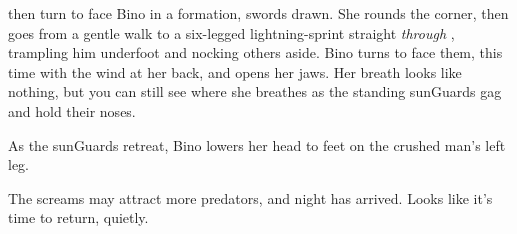 then turn to face Bino in a formation, swords drawn.
She rounds the corner, then goes from a gentle walk to a six-legged lightning-sprint straight \emph{through} , trampling him underfoot and nocking others aside.
Bino turns to face them, this time with the wind at her back, and opens her jaws.
Her breath looks like nothing, but you can still see where she breathes as the standing \glspl{sunGuard} gag and hold their noses.

As the \glspl{sunGuard} retreat, Bino lowers her head to feet on the crushed man's left leg.

The screams may attract more predators, and night has arrived.
Looks like it's time to return, quietly.

